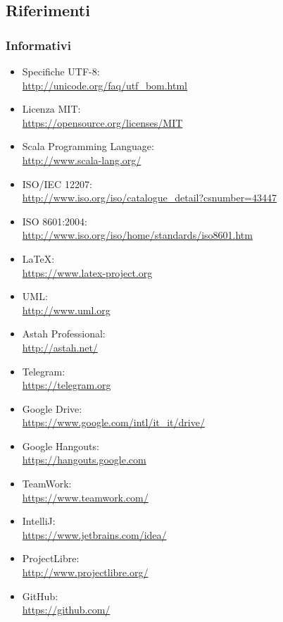 \documentclass[a4paper]{article}
\begin{document}
		\subsection{Riferimenti}
			\subsubsection{Informativi}
				\begin{itemize}
					\item Specifiche UTF-8: \\ \url{http://unicode.org/faq/utf_bom.html}
					\item Licenza MIT: \\ \url{https://opensource.org/licenses/MIT}
					\item Scala Programming Language: \\ \url{http://www.scala-lang.org/}
					\item ISO/IEC 12207: \\ \url{http://www.iso.org/iso/catalogue_detail?csnumber=43447}
					\item ISO 8601:2004: \\ \url{http://www.iso.org/iso/home/standards/iso8601.htm}
					\item \LaTeX: \\ \url{https://www.latex-project.org}
					\item UML: \\ \url{http://www.uml.org}
					\item Astah Professional: \\ \url{http://astah.net/}
					\item Telegram: \\ \url{https://telegram.org}
					\item Google Drive: \\ \url{https://www.google.com/intl/it_it/drive/}
					\item Google Hangouts: \\ \url{https://hangouts.google.com}
					\item TeamWork: \\ \url{https://www.teamwork.com/}
					\item IntelliJ: \\ \url{https://www.jetbrains.com/idea/}
					\item ProjectLibre: \\ \url{http://www.projectlibre.org/}
					\item GitHub: \\ \url{https://github.com/}

\end{itemize}
\end{document}
